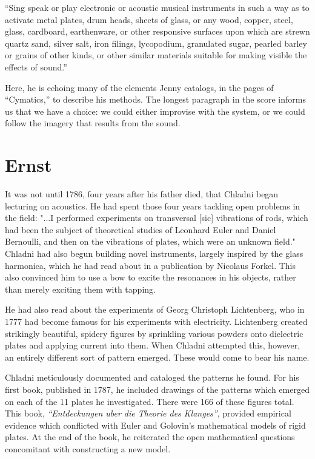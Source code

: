 \documentclass[a4paper,10pt]{report}
\numberwithin{equation}{section}
\begin{document}
\begin{singlespace}
``Sing speak or play electronic or acoustic musical instruments in such a way as to activate metal plates, drum heads, sheets of glass, or any wood, copper, steel, glass, cardboard, earthenware, or other responsive surfaces upon which are strewn quartz sand, silver salt, iron filings, lycopodium, granulated sugar, pearled barley or grains of other kinds, or other similar materials suitable for making visible the effects of sound.''
\end{singlespace}

Here, he is echoing many of the elements Jenny catalogs, in the pages of ``Cymatics,'' to describe his methods.\cite{Jenny2001} The longest paragraph in the score informs us that we have a choice: we could either improvise with the system, or we could follow the imagery that results from the sound.

\section{Ernst}\label{chladni}
 It was not until 1786, four years after his father died, that Chladni began lecturing on acoustics. He had spent those four years tackling open problems in the field: "...I performed experiments on transversal [sic] vibrations of rods, which had been the subject of theoretical studies of Leonhard Euler and Daniel Bernoulli, and then on the vibrations of plates, which were an unknown field."\cite[p.~27]{Ullmann2007} Chladni had also begun building novel instruments, largely inspired by the glass harmonica, which he had read about in a publication by Nicolaus Forkel. This also convinced him to use a bow to excite the resonances in his objects, rather than merely exciting them with tapping.\cite[p.~27]{Ullmann2007}

He had also read about the experiments of Georg Christoph Lichtenberg, who in 1777 had become famous for his experiments with electricity. Lichtenberg created strikingly beautiful, spidery figures by sprinkling various powders onto dielectric plates and applying current into them. When Chladni attempted this, however, an entirely different sort of pattern emerged. These would come to bear his name.\cite[p.~27]{Ullmann2007}

Chladni meticulously documented and cataloged the patterns he found. For his first book, published in 1787, he included drawings of the patterns which emerged on each of the 11 plates he investigated. There were 166 of these figures total. This book, \emph{``Entdeckungen uber die Theorie des Klanges''}, provided empirical evidence which conflicted with Euler and Golovin's mathematical models of rigid plates. At the end of the book, he reiterated the open mathematical questions concomitant with constructing a new model.\cite[p.~27]{Ullmann2007}
\end{document}
